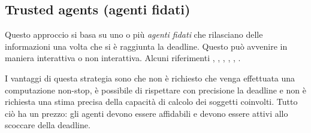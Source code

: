 \subsection{Trusted agents (agenti fidati)}
\label{subsec:trusted-agents}
Questo approccio si basa su uno o più \textit{agenti fidati} che rilasciano
delle informazioni una volta che si è raggiunta la deadline. Questo può avvenire in
maniera interattiva o non interattiva. Alcuni riferimenti
\cite{time-capsule-signature}, \cite{10.1007/11602897_25}, \cite{10.1007/3-540-48910-X_6},
\cite{10.1007/11889663_17}, \cite{10.1007/978-3-642-15317-4_1}, \cite{10.1145/1330332.1330336}.

I vantaggi di questa strategia sono che non è richiesto che venga effettuata una computazione non-stop,
è possibile di rispettare con precisione la deadline e non è richiesta una stima precisa
della capacità di calcolo dei soggetti coinvolti. Tutto ciò ha un prezzo: gli agenti devono
essere affidabili e devono essere attivi allo scoccare della deadline.

